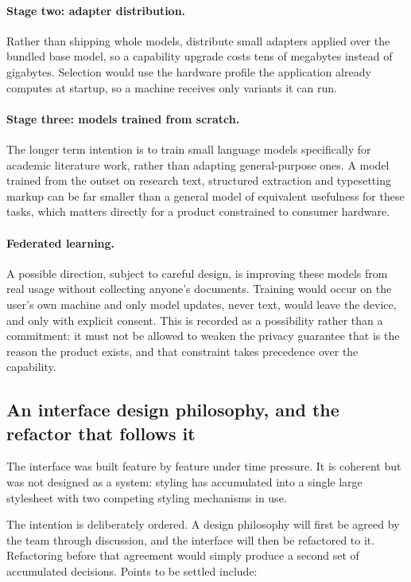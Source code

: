 \documentclass[11pt,a4paper]{article}
\begin{document}
\paragraph{Stage two: adapter distribution.} Rather than shipping whole models,
distribute small adapters applied over the bundled base model, so a capability
upgrade costs tens of megabytes instead of gigabytes. Selection would use the
hardware profile the application already computes at startup, so a machine
receives only variants it can run.

\paragraph{Stage three: models trained from scratch.} The longer term intention
is to train small language models specifically for academic literature work,
rather than adapting general-purpose ones. A model trained from the outset on
research text, structured extraction and typesetting markup can be far smaller
than a general model of equivalent usefulness for these tasks, which matters
directly for a product constrained to consumer hardware.

\paragraph{Federated learning.} A possible direction, subject to careful design,
is improving these models from real usage without collecting anyone's documents.
Training would occur on the user's own machine and only model updates, never
text, would leave the device, and only with explicit consent. This is recorded
as a possibility rather than a commitment: it must not be allowed to weaken the
privacy guarantee that is the reason the product exists, and that constraint
takes precedence over the capability.

\subsection{An interface design philosophy, and the refactor that follows it}

The interface was built feature by feature under time pressure. It is coherent
but was not designed as a system: styling has accumulated into a single large
stylesheet with two competing styling mechanisms in use.

The intention is deliberately ordered. A design philosophy will first be agreed
by the team through discussion, and the interface will then be refactored to it.
Refactoring before that agreement would simply produce a second set of
accumulated decisions. Points to be settled include:
\end{document}
